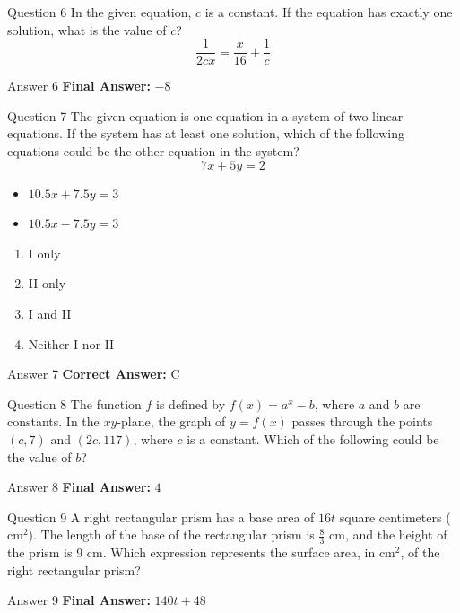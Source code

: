 \documentclass{beamer}
\begin{document}
\begin{frame}{Question 6}
\small
In the given equation, \(c\) is a constant.
If the equation has exactly one solution, what is the value of \(c\)?
\[
\frac{1}{2cx} = \frac{x}{16} + \frac{1}{c}
\]
\end{frame}
\begin{frame}{Answer 6}
\small
\textbf{Final Answer:} $\boxed{-8}$
\end{frame}

\begin{frame}{Question 7}
\small
The given equation is one equation in a system of two linear equations.
If the system has at least one solution, which of the following equations could be the other equation in the system?
\[
7x + 5y = 2
\]

\begin{itemize}
\item[I] \(10.5x + 7.5y = 3\)
\item[II] \(10.5x - 7.5y = 3\)
\end{itemize}
\vspace{0.35cm}
\begin{enumerate}
    \item[A.] I only
    \item[B.] II only
    \item[C.] I and II
    \item[D.] Neither I nor II
\end{enumerate}
\end{frame}
\begin{frame}{Answer 7}
\small
\textbf{Correct Answer:} C
\end{frame}

\begin{frame}{Question 8}
\small
The function \(f\) is defined by \(f(x) = a^{x} - b\), where \(a\) and \(b\) are constants.
In the \(xy\)-plane, the graph of \(y = f(x)\) passes through the points \((c, 7)\) and \((2c, 117)\), where \(c\) is a constant.
Which of the following could be the value of \(b\)?
\end{frame}
\begin{frame}{Answer 8}
\small
\textbf{Final Answer:} $\boxed{4}$
\end{frame}

\begin{frame}{Question 9}
\small
A right rectangular prism has a base area of \(16t\) square centimeters (\(\text{cm}^2\)).
The length of the base of the rectangular prism is \(\frac{8}{3}\) cm, and the height of the prism is 9 cm.
Which expression represents the surface area, in \(\text{cm}^2\), of the right rectangular prism?
\end{frame}
\begin{frame}{Answer 9}
\small
\textbf{Final Answer:} $\boxed{140t+48}$
\end{frame}
\end{document}
